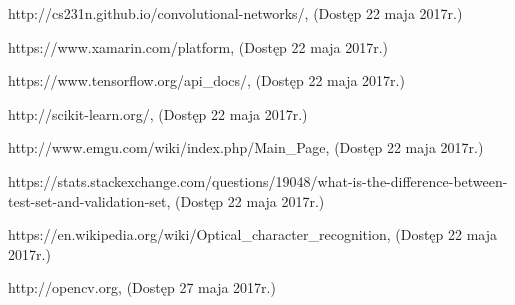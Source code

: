 \documentclass[brudnopis]{xmgr}
\begin{document}
\begin{thebibliography}{9}
  http://cs231n.github.io/convolutional-networks/, 
  (Dostęp 22 maja 2017r.)

  https://www.xamarin.com/platform, 
  (Dostęp 22 maja 2017r.)

  https://www.tensorflow.org/api\_docs/, 
  (Dostęp 22 maja 2017r.)

  http://scikit-learn.org/, 
  (Dostęp 22 maja 2017r.)  

  http://www.emgu.com/wiki/index.php/Main\_Page, 
  (Dostęp 22 maja 2017r.)
  
  https://stats.stackexchange.com/questions/19048/what-is-the-difference-between-test-set-and-validation-set, 
  (Dostęp 22 maja 2017r.)

  https://en.wikipedia.org/wiki/Optical\_character\_recognition, 
  (Dostęp 22 maja 2017r.)

  http://opencv.org,
  (Dostęp 27 maja 2017r.)

\end{thebibliography}

\oswiadczenie
\end{document}
